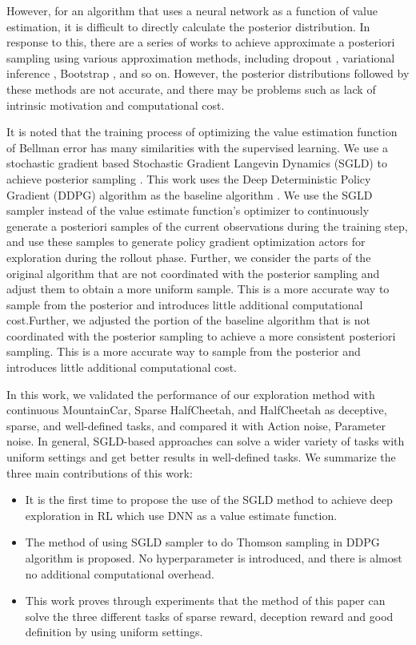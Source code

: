 However, for an algorithm that uses a neural network as a function of value estimation, it is difficult to directly calculate the posterior distribution. In response to this, there are a series of works to achieve approximate a posteriori sampling using various approximation methods, including dropout \cite{dropoutInference}, variational inference \cite{VIME}, Bootstrap \cite{BDQN}, and so on. However, the posterior distributions followed by these methods are not accurate, and there may be problems such as lack of intrinsic motivation and computational cost. \cite{osband2018randomized}

It is noted that the training process of optimizing the value estimation function of Bellman error has many similarities with the supervised learning. We use a stochastic gradient based Stochastic Gradient Langevin Dynamics (SGLD) to achieve posterior sampling \cite{SGLD}. This work uses the Deep Deterministic Policy Gradient (DDPG) algorithm as the baseline algorithm \cite{DDPG}. We use the SGLD sampler instead of the value estimate function's optimizer to continuously generate a posteriori samples of the current observations during the training step, and use these samples to generate policy gradient optimization actors for exploration during the rollout phase. Further, we consider the parts of the original algorithm that are not coordinated with the posterior sampling and adjust them to obtain a more uniform sample. This is a more accurate way to sample from the posterior and introduces little additional computational cost.Further, we adjusted the portion of the baseline algorithm that is not coordinated with the posterior sampling to achieve a more consistent posteriori sampling. This is a more accurate way to sample from the posterior and introduces little additional computational cost.

In this work, we validated the performance of our exploration method with continuous MountainCar, Sparse HalfCheetah, and HalfCheetah as deceptive, sparse, and well-defined tasks, and compared it with Action noise, Parameter noise. In general, SGLD-based approaches can solve a wider variety of tasks with uniform settings and get better results in well-defined tasks. We summarize the three main contributions of this work:
\begin{itemize}
\item  It is the first time to propose the use of the SGLD method to achieve deep exploration in RL which use DNN as a value estimate function.
\item  The method of using SGLD sampler to do Thomson sampling in DDPG algorithm is proposed. No hyperparameter is introduced, and there is almost no additional computational overhead.
\item This work proves through experiments that the method of this paper can solve the three different tasks of sparse reward, deception reward and good definition by using uniform settings.
\end{itemize} 

